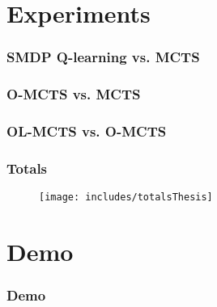 \documentclass[aspectratio=169]{beamer}
\begin{document}
\section{Experiments}
\begin{frame}
	\frametitle{SMDP Q-learning vs. MCTS}
	\begin{figure}
	\centering
	\end{figure}
	\begin{figure}
	\centering
	\end{figure}
\end{frame}

\begin{frame}
	\frametitle{O-MCTS vs. MCTS}
	\begin{figure}
	\centering
	\end{figure}
	\begin{figure}
	\centering
	\end{figure}
\end{frame}

\begin{frame}
	\frametitle{OL-MCTS vs. O-MCTS}
	\begin{figure}
	\centering
	\end{figure}
	\begin{figure}
	\centering
	\end{figure}
\end{frame}

\begin{frame}
	\frametitle{Totals}
	\begin{figure}
	\centering
	\texttt{[image: includes/totalsThesis]}
	\end{figure}
\end{frame}

\section{Demo}
\begin{frame}
	\frametitle{Demo}
\end{frame}
\end{document}
